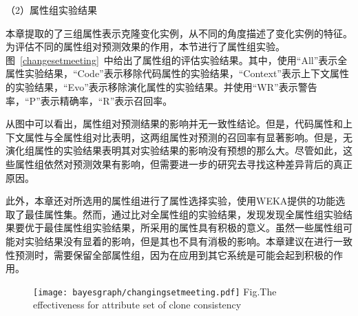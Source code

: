 
（2）属性组实验结果

本章提取的了三组属性表示克隆变化实例，从不同的角度描述了变化实例的特征。为评估不同的属性组对预测效果的作用，本节进行了属性组实验。图~\ref{changesetmeeting}~中给出了属性组的评估实验结果。其中，使用“All”表示全属性实验结果，“Code”表示移除代码属性的实验结果，“Context”表示上下文属性的实验结果，“Evo”表示移除演化属性的实验结果。并使用“WR”表示警告率，“P”表示精确率，“R”表示召回率。

从图中可以看出，属性组对预测结果的影响并无一致性结论。但是，代码属性和上下文属性与全属性组对比表明，这两组属性对预测的召回率有显著影响。但是，无演化组属性的实验结果表明其对实验结果的影响没有预想的那么大。尽管如此，这些属性组依然对预测效果有影响，但需要进一步的研究去寻找这种差异背后的真正原因。

此外，本章还对所选用的属性组进行了属性选择实验，使用WEKA提供的功能选取了最佳属性集。然而，通过比对全属性组的实验结果，发现发现全属性组实验结果要优于最佳属性组实验结果，所采用的属性具有积极的意义。虽然一些属性组可能对实验结果没有显着的影响，但是其也不具有消极的影响。本章建议在进行一致性预测时，需要保留全部属性组，因为在应用到其它系统是可能会起到积极的作用。

\begin{figure}[htbp]
\centering
\texttt{[image: bayesgraph/changingsetmeeting.pdf]}
{Fig.$\!$}{The effectiveness for attribute set of clone consistency}
\vspace{-1em}
\end{figure}

